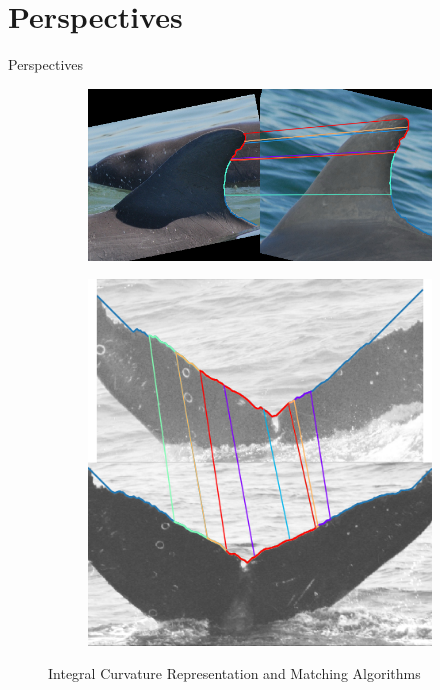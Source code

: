 \section{Perspectives} 
\begin{frame}[c]{Perspectives}
    \begin{figure}
        \centering
        \begin{subfigure}[b]{0.69\linewidth}
            \centering
            \includegraphics[width=\linewidth]{Weideman2017/014.png}
            \captionsetup{labelformat=empty}
            \caption{}
        \end{subfigure}
        \begin{subfigure}[b]{0.29\linewidth}
            \includegraphics[width=\linewidth]{Weideman2017/026.png}
            \captionsetup{labelformat=empty}
            \caption{}
        \end{subfigure}
        \caption{Integral Curvature Representation and Matching Algorithms \cite{weideman_integral_2017}}
    \end{figure}
\end{frame}

